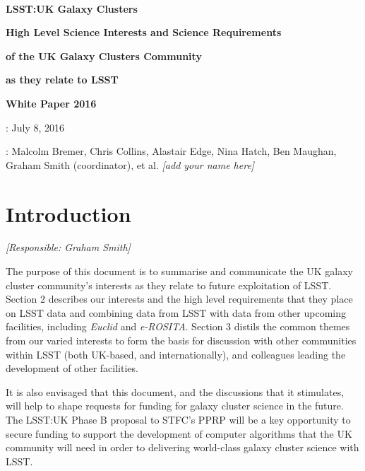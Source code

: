 \documentclass[a4paper,11pt]{article}
\begin{document}
\pagestyle{myheadings}

\sloppy

\pagestyle{empty}

~\vspace{70mm}

\centerline{\LARGE\bf LSST:UK Galaxy Clusters}
\bigskip\bigskip\bigskip
\centerline{\Large\bf High Level Science Interests and Science Requirements}
\medskip
\centerline{\Large\bf of the UK Galaxy Clusters Community}
\medskip
\centerline{\Large\bf as they relate to LSST}
\bigskip\bigskip\bigskip
\centerline{\Large\bf White Paper 2016}

\vspace{90mm}

\large
{}: July 8, 2016

: Malcolm Bremer, Chris Collins, Alastair
Edge, Nina Hatch, Ben Maughan, Graham Smith (coordinator), et al. {\it
  [add your name here]}


\newpage
\pagestyle{myheadings}
\setlength{\topmargin}{-10mm}
\setlength{\textheight}{255mm}

\tableofcontents

\newpage

\section{Introduction}\label{sec:intro}

{\it [Responsible: Graham Smith]}

\noindent
The purpose of this document is to summarise and communicate the UK
galaxy cluster community's interests as they relate to future
exploitation of LSST.  Section 2 describes our interests and the high
level requirements that they place on LSST data and combining data
from LSST with data from other upcoming facilities, including
\emph{Euclid} and \emph{e-ROSITA}.  Section 3 distils the common
themes from our varied interests to form the basis for discussion with
other communities within LSST (both UK-based, and internationally),
and colleagues leading the development of other facilities.

It is also envisaged that this document, and the discussions that it
stimulates, will help to shape requests for funding for galaxy cluster
science in the future.  The LSST:UK Phase B proposal to STFC's PPRP
will be a key opportunity to secure funding to support the development
of computer algorithms that the UK community will need in order to
delivering world-class galaxy cluster science with LSST.
\end{document}
